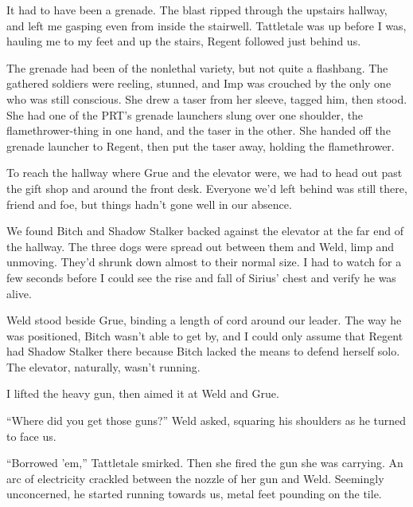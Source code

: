 It had to have been a grenade.  The blast ripped through the upstairs hallway, and left me gasping even from inside the stairwell.  Tattletale was up before I was, hauling me to my feet and up the stairs, Regent followed just behind us.



The grenade had been of the nonlethal variety, but not quite a flashbang.  The gathered soldiers were reeling, stunned, and Imp was crouched by the only one who was still conscious.  She drew a taser from her sleeve, tagged him, then stood.  She had one of the PRT's grenade launchers slung over one shoulder, the flamethrower-thing in one hand, and the taser in the other.  She handed off the grenade launcher to Regent, then put the taser away, holding the flamethrower.



To reach the hallway where Grue and the elevator were, we had to head out past the gift shop and around the front desk.  Everyone we'd left behind was still there, friend and foe, but things hadn't gone well in our absence.



We found Bitch and Shadow Stalker backed against the elevator at the far end of the hallway.  The three dogs were spread out between them and Weld, limp and unmoving.  They'd shrunk down almost to their normal size.  I had to watch for a few seconds before I could see the rise and fall of Sirius' chest and verify he was alive.



Weld stood beside Grue, binding a length of cord around our leader.  The way he was positioned, Bitch wasn't able to get by, and I could only assume that Regent had Shadow Stalker there because Bitch lacked the means to defend herself solo.  The elevator, naturally, wasn't running.



I lifted the heavy gun, then aimed it at Weld and Grue.



``Where did you get those guns?'' Weld asked, squaring his shoulders as he turned to face us.



``Borrowed 'em,'' Tattletale smirked.  Then she fired the gun she was carrying.  An arc of electricity crackled between the nozzle of her gun and Weld.  Seemingly unconcerned, he started running towards us, metal feet pounding on the tile.



